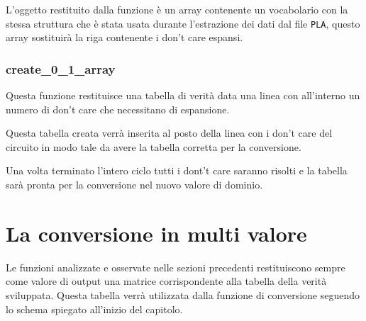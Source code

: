 \documentclass[italian,]{book}
\newenvironment{Shaded}{\begin{snugshade}}{\end{snugshade}}
\newcommand{\BuiltInTok}[1]{#1}
\newcommand{\ControlFlowTok}[1]{\textcolor[rgb]{0.13,0.29,0.53}{\textbf{#1}}}
\newcommand{\DecValTok}[1]{\textcolor[rgb]{0.00,0.00,0.81}{#1}}
\newcommand{\KeywordTok}[1]{\textcolor[rgb]{0.13,0.29,0.53}{\textbf{#1}}}
\newcommand{\NormalTok}[1]{#1}
\newcommand{\OperatorTok}[1]{\textcolor[rgb]{0.81,0.36,0.00}{\textbf{#1}}}
\begin{document}
L'oggetto restituito dalla funzione è un array contenente un vocabolario con la stessa struttura che è stata usata durante l'estrazione dei dati dal file \texttt{PLA}, questo array sostituirà la riga contenente i don't care espansi.

\hypertarget{create_0_1_array}{%
\subsubsection{create\_0\_1\_array}\label{create_0_1_array}}

\begin{Shaded}
\end{Shaded}

Questa funzione restituisce una tabella di verità data una linea con all'interno un numero di don't care che necessitano di espansione.

Questa tabella creata verrà inserita al posto della linea con i don't care del circuito in modo tale da avere la tabella corretta per la conversione.

Una volta terminato l'intero ciclo tutti i dont't care saranno risolti e la tabella sarà pronta per la conversione nel nuovo valore di dominio.

\newpage

\hypertarget{la-conversione-in-multi-valore}{%
\section{La conversione in multi valore}\label{la-conversione-in-multi-valore}}

Le funzioni analizzate e osservate nelle sezioni precedenti restituiscono sempre come valore di output una matrice corrispondente alla tabella della verità sviluppata. Questa tabella verrà utilizzata dalla funzione di conversione seguendo lo schema spiegato all'inizio del capitolo.
\end{document}
